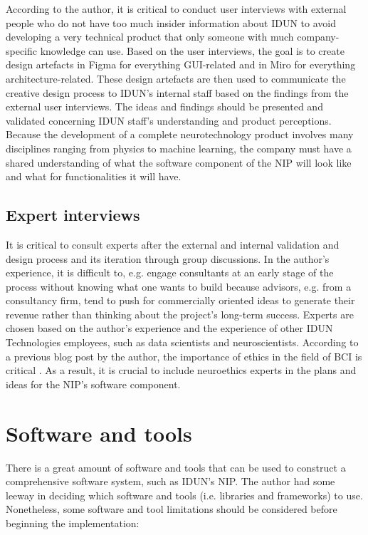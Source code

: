 According to the author, it is critical to conduct user interviews with external people who do not have too much insider information about IDUN to avoid developing a very technical product that only someone with much company-specific knowledge can use. Based on the user interviews, the goal is to create design artefacts in Figma for everything GUI-related and in Miro for everything architecture-related. These design artefacts are then used to communicate the creative design process to IDUN's internal staff based on the findings from the external user interviews. The ideas and findings should be presented and validated concerning IDUN staff's understanding and product perceptions. Because the development of a complete neurotechnology product involves many disciplines ranging from physics to machine learning, the company must have a shared understanding of what the software component of the NIP will look like and what for functionalities it will have.

\subsection{Expert interviews}
\label{chapter3-expert-interviews}

It is critical to consult experts after the external and internal validation and design process and its iteration through group discussions. In the author's experience, it is difficult to, e.g. engage consultants at an early stage of the process without knowing what one wants to build because advisors, e.g. from a consultancy firm, tend to push for commercially oriented ideas to generate their revenue rather than thinking about the project's long-term success. Experts are chosen based on the author's experience and the experience of other IDUN Technologies employees, such as data scientists and neuroscientists. According to a previous blog post by the author, the importance of ethics in the field of BCI is critical \citep{burger_influence_2022}. As a result, it is crucial to include neuroethics experts in the plans and ideas for the NIP's software component.

\section{Software and tools}
\label{chapter3-software-and-tools}

There is a great amount of software and tools that can be used to construct a comprehensive software system, such as IDUN's NIP. The author had some leeway in deciding which software and tools (i.e. libraries and frameworks) to use. Nonetheless, some software and tool limitations should be considered before beginning the implementation:

